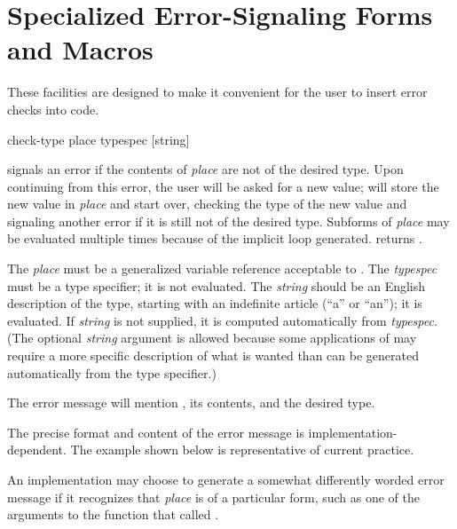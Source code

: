 \section{Specialized Error-Signaling Forms and Macros}
\label{SPECIALIZED-ERROR-SIGNALLING}

These facilities are designed to make it convenient for the user
to insert error checks into code.

\begin{defmac}
check-type place typespec [string]

\begin{obsolete}\noindent
{} signals an error if the contents of {\it place} are not
of the desired type.
Upon continuing from this error, the user will be asked for a new value;
 will store the new value in {\it place} and start over, 
checking the type of the new value and signaling
another error if it is still not of the desired type.  Subforms of
{\it place} may be evaluated multiple times because of the implicit
loop generated.   returns {\false}.

The {\it place} must be a generalized variable reference acceptable to
.
The {\it typespec} must be a type specifier; it is not evaluated.
The {\it string} should be an English description of the type, starting with
an indefinite article (``a'' or ``an''); it is evaluated.
If {\it string} is
not supplied, it is computed automatically from {\it typespec}.
(The optional {\it string} argument is allowed because some applications
of  may require a more specific description of what is
wanted than can be generated automatically from the type specifier.)

The error message will mention , its contents, and the desired type.
\end{obsolete}

\begin{newer}
The precise format and content of the error message
is implementation-dependent.  The example shown below
is representative of current practice.
\end{newer}

\beforenoterule
\begin{implementation}
An implementation may choose to
generate a somewhat differently worded
error message if it recognizes that {\it place} is of a particular
form, such as one of the arguments to
the function that called .
\end{implementation}
\afternoterule


\end{defmac}
